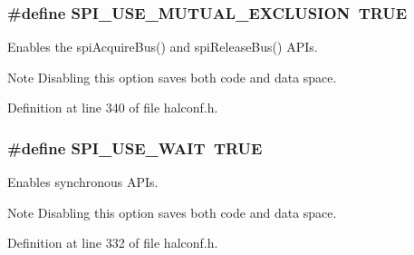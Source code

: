 \subsubsection[{S\+P\+I\+\_\+\+U\+S\+E\+\_\+\+M\+U\+T\+U\+A\+L\+\_\+\+E\+X\+C\+L\+U\+S\+I\+O\+N}]{\setlength{\rightskip}{0pt plus 5cm}\#define S\+P\+I\+\_\+\+U\+S\+E\+\_\+\+M\+U\+T\+U\+A\+L\+\_\+\+E\+X\+C\+L\+U\+S\+I\+O\+N~T\+R\+U\+E}\label{group__HAL__CONF_ga36d1818f9631f955f7cc94629b1d5498}


Enables the {\ttfamily spi\+Acquire\+Bus()} and {\ttfamily spi\+Release\+Bus()} A\+P\+Is. 

\begin{DoxyNote}{Note}
Disabling this option saves both code and data space. 
\end{DoxyNote}


Definition at line 340 of file halconf.\+h.

\hypertarget{group__HAL__CONF_ga0c9ab1488423fa10a22f506c6e74b563}{}
\subsubsection[{S\+P\+I\+\_\+\+U\+S\+E\+\_\+\+W\+A\+I\+T}]{\setlength{\rightskip}{0pt plus 5cm}\#define S\+P\+I\+\_\+\+U\+S\+E\+\_\+\+W\+A\+I\+T~T\+R\+U\+E}\label{group__HAL__CONF_ga0c9ab1488423fa10a22f506c6e74b563}


Enables synchronous A\+P\+Is. 

\begin{DoxyNote}{Note}
Disabling this option saves both code and data space. 
\end{DoxyNote}


Definition at line 332 of file halconf.\+h.

